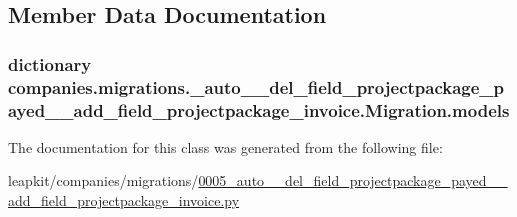 \subsection{Member Data Documentation}
\hypertarget{classcompanies_1_1migrations_1_10005__auto____del__field__projectpackage__payed____add__field__pe9cf5cf6afe1151e043f1d94db59b0b0_a0c8c1d59142a9baf9c7f625b38883cec}{
\subsubsection[{models}]{\setlength{\rightskip}{0pt plus 5cm}dictionary companies.\-migrations.\-\_\-auto\-\_\-\-\_\-del\-\_\-field\-\_\-projectpackage\-\_\-payed\-\_\-\-\_\-add\-\_\-field\-\_\-projectpackage\-\_\-invoice.\-Migration.\-models\hspace{0.3cm}{\ttfamily [static]}}}\label{classcompanies_1_1migrations_1_10005__auto____del__field__projectpackage__payed____add__field__pe9cf5cf6afe1151e043f1d94db59b0b0_a0c8c1d59142a9baf9c7f625b38883cec}


The documentation for this class was generated from the following file\-:\begin{DoxyCompactItemize}
\item 
leapkit/companies/migrations/\hyperlink{0005__auto____del__field__projectpackage__payed____add__field__projectpackage__invoice_8py}{0005\-\_\-auto\-\_\-\-\_\-del\-\_\-field\-\_\-projectpackage\-\_\-payed\-\_\-\-\_\-add\-\_\-field\-\_\-projectpackage\-\_\-invoice.\-py}\end{DoxyCompactItemize}
